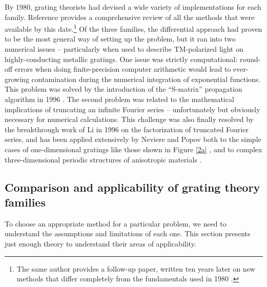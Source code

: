 By 1980, grating theorists had devised a wide variety of implementations for each family.  %
Reference \cite{Pet80} provides a comprehensive review of all the methods that were available by this date.\footnote{The same author provides a follow-up paper, written ten years later on new methods that differ completely from the fundamentals used in 1980 \cite{Pet90}.}  Of the three families, the differential approach had proven to be the most general way of setting up the problem, but it ran into two numerical issues -- particularly when used to describe TM-polarized light on highly-conducting metallic gratings.  One issue was strictly computational: round-off errors when doing finite-precision computer arithmetic would lead to ever-growing contamination during the numerical integration of exponential functions.  This problem was solved by the introduction of the ``S-matrix'' propagation algorithm in 1996 \cite{Li96}\cite{Mon98}.  The second problem was related to the mathematical implications of truncating an infinite Fourier series -- unfortunately but obviously necessary for numerical calculations.  This challenge was also finally resolved by the breakthrough work of Li \cite{Li96b} in 1996 on the factorization of truncated Fourier series, and has been applied extensively by Neviere and Popov both to the simple cases of one-dimensional gratings like those shown in Figure \ref{2a} \cite{Pop01}, and to complex three-dimensional periodic structures of anisotropic materials \cite{Pop00}\cite{Nev02}.

\subsection{Comparison and applicability of grating theory families}
To choose an appropriate method for a particular problem, we need to understand the assumptions and limitations of each one.  This section presents just enough theory to understand their areas of applicability.
